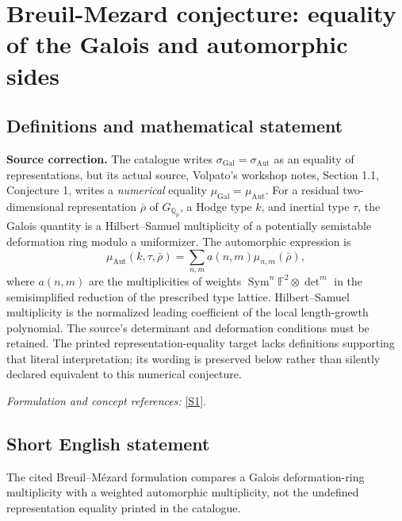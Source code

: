 \documentclass[11pt,a4paper]{article}
\newcommand{\Q}{\mathbb{Q}}
\newcommand{\F}{\mathbb{F}}
\newcommand{\sref}[2]{\hyperlink{source:#1:#2}{[S#2]}}
\newif\ifshowcatalogue
\newcommand{\cataloguescope}[1]{\ifshowcatalogue
 \paragraph{Exact scope in the supplied catalogue.}
 \begin{quote}\small #1\end{quote}\fi}
\numberwithin{equation}{section}
\begin{document}
\setcounter{section}{0}
\clearpage
\section*{\texorpdfstring{Breuil-Mezard conjecture: equality of the Galois and automorphic sides}{Breuil-Mezard conjecture: equality of the Galois and automorphic sides}}\label{statement}
\subsection{Definitions and mathematical statement}
\textbf{Source correction.} The catalogue writes $\sigma_{\mathrm{Gal}}=\sigma_{\mathrm{Aut}}$ as an equality of representations, but its actual source, Volpato's workshop notes, Section 1.1, Conjecture 1, writes a \emph{numerical} equality $\mu_{\mathrm{Gal}}=\mu_{\mathrm{Aut}}$. For a residual two-dimensional representation $\bar\rho$ of $G_{\Q_p}$, a Hodge type $k$, and inertial type $\tau$, the Galois quantity is a Hilbert--Samuel multiplicity of a potentially semistable deformation ring modulo a uniformizer. The automorphic expression is
\[
 \mu_{\mathrm{Aut}}(k,\tau,\bar\rho)=\sum_{n,m}a(n,m)\mu_{n,m}(\bar\rho),
\]
where $a(n,m)$ are the multiplicities of weights
$\operatorname{Sym}^n\F^2\otimes\det^m$ in the semisimplified reduction of the prescribed type lattice. Hilbert--Samuel multiplicity is the normalized leading coefficient of the local length-growth polynomial. The source's determinant and deformation conditions must be retained. The printed representation-equality target lacks definitions supporting that literal interpretation; its wording is preserved below rather than silently declared equivalent to this numerical conjecture.
\par\smallskip\textit{Formulation and concept references:} \sref{statement}{1}.
\cataloguescope{Conjecture (Breuil-Mezard): the equality sigma\_Gal = sigma\_Aut holds, where sigma\_Gal and sigma\_Aut are the Galois and automorphic (locally algebraic) representations attached to a mod p Galois representation.}
\subsection{Short English statement}
The cited Breuil–Mézard formulation compares a Galois deformation-ring multiplicity with a weighted automorphic multiplicity, not the undefined representation equality printed in the catalogue.
\end{document}
